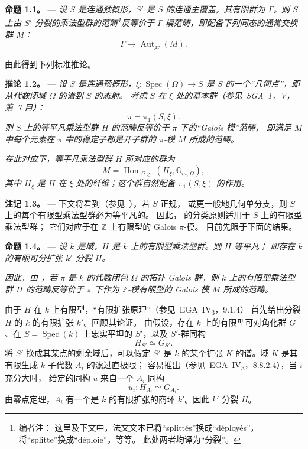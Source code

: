 \medskip
\noindent{}%
\textbf{命题 1.1。} ---
\textit{设 \(S\) 是连通预概形，\(S'\) 是 \(S\) 的连通主覆盖，其有限群为
\(\Gamma\)。则 \(S\) 上由 \(S'\) 分裂的乘法型群的范畴\footnote{编者注：
这里及下文中，法文文本已将“splittés”换成“déployés”，将“splitte”换成“déploie”，等等。
此处两者均译为“分裂”。}反等价于 \(\Gamma\)-模范畴，即配备下列同态的通常交换群 \(M\)：
\[
  \Gamma\longrightarrow\operatorname{Aut}_{\mathrm{gr}}(M).
\]}

由此得到下列标准推论。

\medskip
\noindent{}%
\textbf{推论 1.2。} ---
\textit{设 \(S\) 是连通预概形，\(\xi:\operatorname{Spec}(\Omega)\to S\) 是
\(S\) 的一个“几何点”，即从代数闭域 \(\Omega\) 的谱到 \(S\) 的态射。
考虑 \(S\) 在 \(\xi\) 处的基本群（参见\ SGA~1，V，第~7 目）：
\[
  \pi=\pi_1(S,\xi).
\]
则 \(S\) 上的等平凡乘法型群 \(H\) 的范畴反等价于 \(\pi\) 下的“Galois 模”范畴，
即满足 \(M\) 中每个元素在 \(\pi\) 中的稳定子都是开子群的 \(\pi\)-模 \(M\) 所成的范畴。}

\textit{在此对应下，等平凡乘法型群 \(H\) 所对应的群为
\[
  M=\operatorname{Hom}_{\Omega\text{-}\mathrm{gr}}
       (H_\xi,\mathbb G_{m,\Omega}),
\]
其中 \(H_\xi\) 是 \(H\) 在 \(\xi\) 处的纤维；这个群自然配备
\(\pi_1(S,\xi)\) 的作用。}

\medskip
\noindent{}%
\textbf{注记 1.3。} ---
下文将看到（参见\ ），若 \(S\) 正规，
或更一般地几何单分支，则 \(S\) 上的每个有限型乘法型群必为等平凡的。
因此， 的分类原则适用于 \(S\) 上的有限型乘法型群；
它们对应于在 \(\mathbb Z\) 上有限型的 Galois \(\pi\)-模。
目前先限于下面的结果。

\medskip
\noindent{}%
\textbf{命题 1.4。} ---
\textit{设 \(k\) 是域，\(H\) 是 \(k\) 上的有限型乘法型群。则 \(H\) 等平凡；
即存在 \(k\) 的有限可分扩张 \(k'\) 分裂 \(H\)。}

\textit{因此，由 ，若 \(\pi\) 是
\(k\) 的代数闭包 \(\Omega\) 的拓扑 Galois 群，则 \(k\) 上的有限型乘法型群
\(H\) 的范畴反等价于 \(\pi\) 下作为 \(\mathbb Z\)-模有限型的 Galois 模 \(M\) 所成的范畴。}

由于 \(H\) 在 \(k\) 上有限型，“有限扩张原理”（参见\ EGA~IV\textsubscript{3}，9.1.4）
首先给出分裂 \(H\) 的 \(k\) 的有限扩张 \(k'\)。回顾其论证。
由假设，存在 \(k\) 上的有限型可对角化群 \(G\)、在 \(S=\operatorname{Spec}(k)\)
上忠实平坦的 \(S'\)，以及 \(S'\)-群同构
\[
  H_{S'}\simeq G_{S'}.
\]
将 \(S'\) 换成其某点的剩余域后，可以假定 \(S'\) 是 \(k\) 的某个扩张
\(K\) 的谱。域 \(K\) 是其有限生成 \(k\)-子代数 \(A_i\) 的滤过直极限；
容易推出（参见\ EGA~IV\textsubscript{3}，8.8.2.4），当 \(i\) 充分大时，
给定的同构 \(u\) 来自一个 \(A_i\)-同构
\[
  u_i:H_{A_i}\simeq G_{A_i}.
\]
由零点定理，\(A_i\) 有一个是 \(k\) 的有限扩张的商环 \(k'\)。因此 \(k'\) 分裂 \(H\)。

